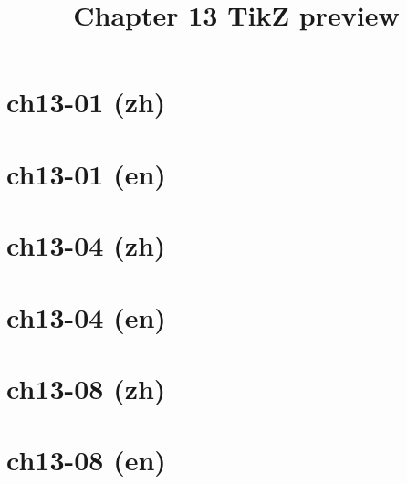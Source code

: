 \documentclass[11pt,a4paper]{article}
\title{Chapter 13 TikZ preview}
\date{}
\begin{document}
\maketitle

\section*{ch13-01 (zh)}
\par\noindent

\newpage
\section*{ch13-01 (en)}
\par\noindent

\newpage
\section*{ch13-04 (zh)}
\par\noindent

\newpage
\section*{ch13-04 (en)}
\par\noindent

\newpage
\section*{ch13-08 (zh)}
\par\noindent

\newpage
\section*{ch13-08 (en)}
\par\noindent

\end{document}
